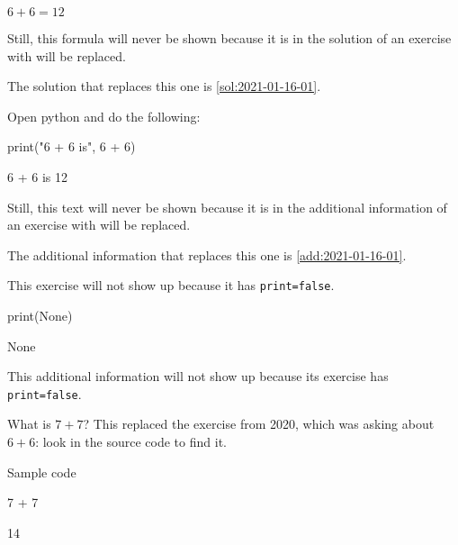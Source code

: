 \documentclass{book}
\begin{document}
\begin{solution}
  \(6 + 6 = 12\)

Still, this formula will never be shown because it is in the solution of an exercise with will be replaced.

The solution that replaces this one is \cref{sol:2021-01-16-01}.
\end{solution}

\begin{additionalinformation}
Open python and do the following:

\begin{pycell}
print("6 + 6 is", 6 + 6)
\end{pycell}
\begin{pyexpectedoutput}
6 + 6 is 12
\end{pyexpectedoutput}

Still, this text will never be shown because it is in the additional information of an exercise with will be replaced.

The additional information that replaces this one is \cref{add:2021-01-16-01}.
\end{additionalinformation}

\begin{exercise}[print=false]
This exercise will not show up because it has \texttt{print=false}.
\end{exercise}

\begin{solution}
\begin{pycell}
print(None)
\end{pycell}
\begin{pyexpectedoutput}
None
\end{pyexpectedoutput}
\end{solution}

\begin{additionalinformation}
This additional information will not show up because its exercise has \texttt{print=false}.
\end{additionalinformation}

\begin{exercise}[examdate={January 16, 2021}, examproblemnumber={1}, examproblemid={2021-01-16-01}]
  What is \(7 + 7\)? This replaced the exercise from 2020, which was asking about \(6 + 6\): look in the source code to find it.

Sample code
\begin{pycell}
7 + 7
\end{pycell}
\begin{pyexpectedoutput}
14
\end{pyexpectedoutput}
\end{exercise}
\end{document}
